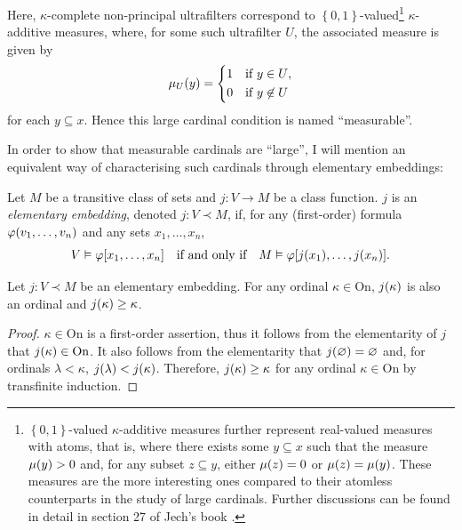 \documentclass[12pt]{article}
\theoremstyle{plain}
\theoremstyle{definition}
\newcommand{\On}{\mathrm{On}}
\begin{document}
Here, $\kappa$-complete non-principal ultrafilters correspond to $\left\{0, 1\right\}$-valued\footnote{$\left\{0, 1\right\}$-valued $\kappa$-additive measures further represent real-valued measures with atoms, that is, where there exists some $y \subseteq x$ such that the measure $\mu\mleft(y\mright) > 0$ and, for any subset $z \subseteq y$, either $\mu\mleft(z\mright) = 0$ or $\mu\mleft(z\mright) = \mu\mleft(y\mright)$. These measures are the more interesting ones compared to their atomless counterparts in the study of large cardinals. Further discussions can be found in detail in section 27 of Jech's book \cite{jech-set-theory}.} $\kappa$-additive measures, where, for some such ultrafilter $U$, the associated measure is given by
\[\mu_U\mleft(y\mright) = \left\{\begin{aligned}
		 & 1 &  & \text{if $y \in U$},    \\
		 & 0 &  & \text{if $y \not\in U$}
	\end{aligned}\right.\]
for each $y \subseteq x$. Hence this large cardinal condition is named ``measurable''.

In order to show that measurable cardinals are ``large'', I will mention an equivalent way of characterising such cardinals through elementary embeddings:

\begin{definition}
	Let $M$ be a transitive class of sets and $j : V \rightarrow M$ be a class function. $j$ is an \emph{elementary embedding}, denoted $j : V \prec M$, if, for any (first-order) formula $\varphi\mleft(v_1, \ldots, v_n\mright)$ and any sets $x_1, \ldots, x_n$,
	\[V \vDash \varphi\mleft[x_1, \ldots, x_n\mright] \quad \text{if and only if} \quad M \vDash \varphi\mleft[j\mleft(x_1\mright), \ldots, j\mleft(x_n\mright)\mright].\]
\end{definition}

\begin{lemma}
	\label{lem:elementary-embedding-preserve-ordinals}
	Let $j : V \prec M$ be an elementary embedding. For any ordinal $\kappa \in \On$, $j\mleft(\kappa\mright)$ is also an ordinal and $j\mleft(\kappa\mright) \geq \kappa$.
\end{lemma}

\begin{proof}
	$\kappa \in \On$ is a first-order assertion, thus it follows from the elementarity of $j$ that $j\mleft(\kappa\mright) \in \On$. It also follows from the elementarity that $j\mleft(\varnothing\mright) = \varnothing$ and, for ordinals $\lambda < \kappa$, $j\mleft(\lambda\mright) < j\mleft(\kappa\mright)$. Therefore, $j\mleft(\kappa\mright) \geq \kappa$ for any ordinal $\kappa \in \On$ by transfinite induction.
\end{proof}
\end{document}
